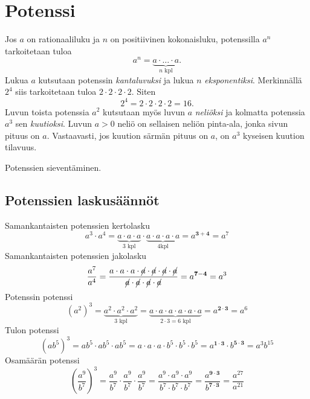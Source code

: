 \section{Potenssi}
    
    Jos $a$ on rationaaliluku ja $n$ on positiivinen kokonaisluku, potenssilla $a^n$ tarkoitetaan tuloa
    \[
        a^n = \underbrace{a\cdot \ldots \cdot a}_{n\text{ kpl}}. 
    \]
Lukua $a$ kutsutaan potenssin \emph{kantaluvuksi} ja lukua $n$ \emph{eksponentiksi}. Merkinnällä $2^4$ siis tarkoitetaan tuloa $2\cdot 2\cdot 2\cdot 2$. Siten
        \[
            2^4=2\cdot 2\cdot 2\cdot 2=16.
        \]
Luvun toista potenssia $a^2$ kutsutaan myös luvun $a$ \emph{neliöksi} ja kolmatta potenssia $a^3$ sen \emph{kuutioksi}. Luvun $a>0$ neliö on sellaisen neliön pinta-ala, jonka sivun pituus on $a$. Vastaavasti, jos kuution särmän pituus on $a$, on $a^3$ kyseisen kuution tilavuus.  
            
    \begin{esimerkki}
        Potenssien sieventäminen.
        \begin{alakohdat}
        \end{alakohdat}
    \end{esimerkki}
    
\subsection*{Potenssien laskusäännöt}
    
    Samankantaisten potenssien kertolasku
	\[
a^3\cdot a^4=\underbrace{a\cdot a\cdot a}_{\text{3 kpl}}\cdot \underbrace{a\cdot a\cdot a\cdot a}_{\text{4kpl}}=a^{\mathbf{3+4}}=a^7
    	\]
    Samankantaisten potenssien jakolasku
	\[
\frac{a^7}{a^4}=\frac{a\cdot a\cdot a\cdot \cancel{a}\cdot \cancel{a}\cdot \cancel{a}\cdot \cancel{a}}	{\cancel{a}\cdot \cancel{a}\cdot \cancel{a}\cdot \cancel{a}}=a^{\mathbf{7-4}}=a^3
    	\]
    Potenssin potenssi
	\[
(a^2)^3=\underbrace{a^2\cdot a^2\cdot a^2}_{3\text{ kpl}}=\underbrace{a\cdot a\cdot a\cdot a\cdot a\cdot a}_{2\cdot 3=6\text{ kpl}}=a^{\boldsymbol{{2\cdot 3}}}=a^6
\]
    Tulon potenssi
	\[
(ab^5)^3=ab^5\cdot ab^5\cdot ab^5=a\cdot a\cdot a\cdot b^5\cdot b^5\cdot b^5=a^{\mathbf{1\cdot 3}}\cdot b^{\mathbf{5\cdot 3}}=a^3b^{15}
	\]
     Osamäärän potenssi
	\[
	\left(\frac{a^9}{b^7}\right)^3=\frac{a^9}{b^7}\cdot \frac{a^9}{b^7}\cdot \frac{a^9}{b^7}=\frac{a^9\cdot a^9\cdot a^9}{b^7\cdot b^7\cdot b^7}=\frac{a^{\mathbf{9\cdot 3}}}{b^{\mathbf{7\cdot 3}}}=\frac{a^{27}}{a^{21}}
	\]

